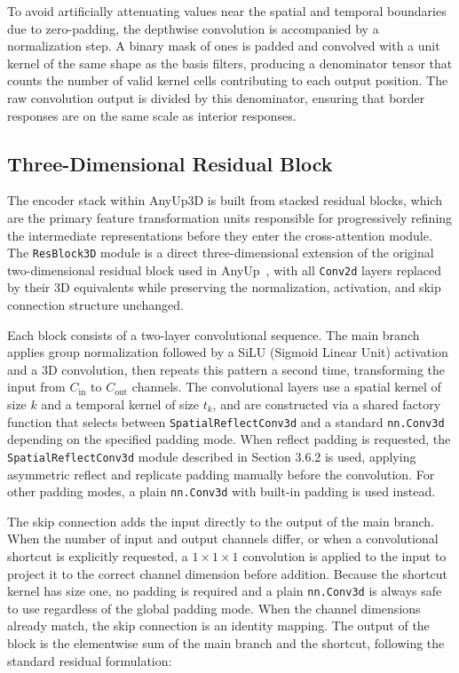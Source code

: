 To avoid artificially attenuating values near the spatial and temporal boundaries due to zero-padding, the depthwise convolution is accompanied by a normalization step. A binary mask of ones is padded and convolved with a unit kernel of the same shape as the basis filters, producing a denominator tensor that counts the number of valid kernel cells contributing to each output position. The raw convolution output is divided by this denominator, ensuring that border responses are on the same scale as interior responses.


\subsection{Three-Dimensional Residual Block}
\label{sec:resblock3d}

The encoder stack within AnyUp3D is built from stacked residual blocks, which are the primary feature transformation units responsible for progressively refining the intermediate representations before they enter the cross-attention module. The \texttt{ResBlock3D} module is a direct three-dimensional extension of the original two-dimensional residual block used in AnyUp~\cite{anyup}, with all \texttt{Conv2d} layers replaced by their 3D equivalents while preserving the normalization, activation, and skip connection structure unchanged.

Each block consists of a two-layer convolutional sequence. The main branch applies group normalization followed by a SiLU (Sigmoid Linear Unit) activation and a 3D convolution, then repeats this pattern a second time, transforming the input from $C_{\text{in}}$ to $C_{\text{out}}$ channels. The convolutional layers use a spatial kernel of size $k$ and a temporal kernel of size $t_k$, and are constructed via a shared factory function that selects between \texttt{SpatialReflectConv3d} and a standard \texttt{nn.Conv3d} depending on the specified padding mode. When reflect padding is requested, the \texttt{SpatialReflectConv3d} module described in Section 3.6.2 is used, applying asymmetric reflect and replicate padding manually before the convolution. For other padding modes, a plain \texttt{nn.Conv3d} with built-in padding is used instead.

The skip connection adds the input directly to the output of the main branch. When the number of input and output channels differ, or when a convolutional shortcut is explicitly requested, a $1 \times 1 \times 1$ convolution is applied to the input to project it to the correct channel dimension before addition. Because the shortcut kernel has size one, no padding is required and a plain \texttt{nn.Conv3d} is always safe to use regardless of the global padding mode. When the channel dimensions already match, the skip connection is an identity mapping. The output of the block is the elementwise sum of the main branch and the shortcut, following the standard residual formulation:

